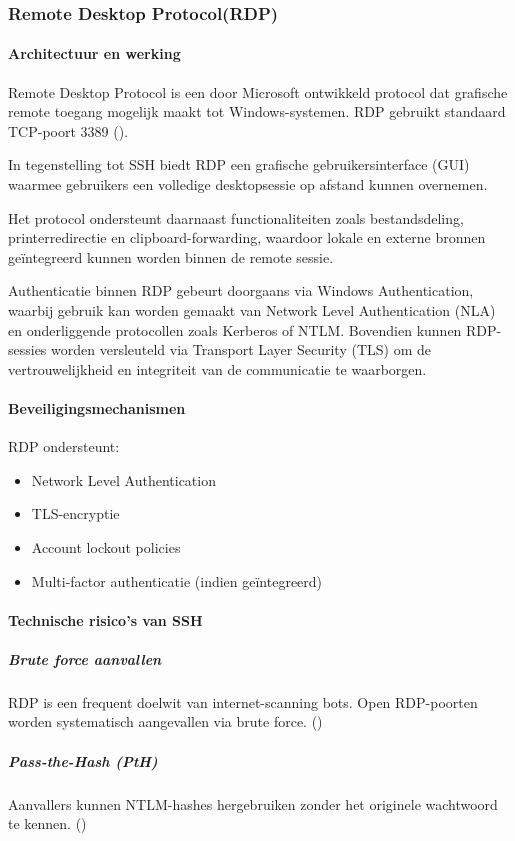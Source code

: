 \subsubsection{Remote Desktop Protocol(RDP)}
\paragraph{Architectuur en werking}
Remote Desktop Protocol is een door Microsoft ontwikkeld protocol dat grafische remote toegang mogelijk maakt tot Windows-systemen. RDP gebruikt standaard TCP-poort 3389 (\cite{microsoft_rdp}).

In tegenstelling tot SSH biedt RDP een grafische gebruikersinterface (GUI) waarmee gebruikers een volledige desktopsessie op afstand kunnen overnemen.

Het protocol ondersteunt daarnaast functionaliteiten zoals bestandsdeling, printerredirectie en clipboard-forwarding, waardoor lokale en externe bronnen geïntegreerd kunnen worden binnen de remote sessie. 

Authenticatie binnen RDP gebeurt doorgaans via Windows Authentication, waarbij gebruik kan worden gemaakt van Network Level Authentication (NLA) en onderliggende protocollen zoals Kerberos of NTLM. Bovendien kunnen RDP-sessies worden versleuteld via Transport Layer Security (TLS) om de vertrouwelijkheid en integriteit van de communicatie te waarborgen.
\paragraph{Beveiligingsmechanismen}
RDP ondersteunt:
\begin{itemize}
	\item Network Level Authentication
	\item TLS-encryptie
	\item Account lockout policies
	\item Multi-factor authenticatie (indien geïntegreerd)
\end{itemize}
\paragraph{Technische risico’s van SSH}
\subparagraph{Brute force aanvallen}
RDP is een frequent doelwit van internet-scanning bots. Open RDP-poorten worden systematisch aangevallen via brute force. (\cite{VerizonDBIR2024})
\subparagraph{Pass-the-Hash (PtH)}
Aanvallers kunnen NTLM-hashes hergebruiken zonder het originele wachtwoord te kennen.
(\cite{MITREPassTheHash})

